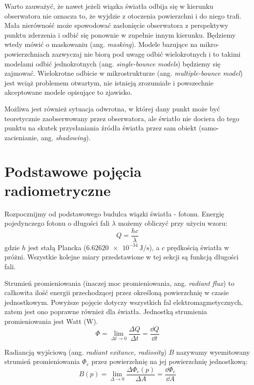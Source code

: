 \documentclass[../main.tex]{subfiles}
\begin{document}
Warto zauważyć, że nawet jeżeli wiązka światła odbija się w kierunku obserwatora nie oznacza to, że wyjdzie z otoczenia powierzchni i do niego trafi. Mała nierówność może spowodować zasłonięcie obserwatora z perspektywy punktu zderzenia i odbić się ponownie w zupełnie innym kierunku. Będziemy wtedy mówić o maskowaniu (ang. \textit{masking}). Modele bazujące na mikro-powierzchniach zazwyczaj nie biorą pod uwagę odbić wielokrotnych i to takimi modelami odbić jednokrotnych (ang. \textit{single-bounce models}) będziemy się zajmować. Wielokrotne odbicie w mikrostrukturze (ang. \textit{multiple-bounce model}) jest wciąż problemem otwartym, nie istnieją zrozumiałe i powszechnie akceptowane modele opisujące to zjawisko.

Możliwa jest również sytuacja odwrotna, w której dany punkt może być teoretycznie zaobserwowany przez obserwatora, ale światło nie dociera do tego punktu na skutek przysłaniania źródła światła przez sam obiekt (samo-zacienianie, ang. \textit{shadowing}).


\section{Podstawowe pojęcia radiometryczne}

Rozpocznijmy od podstawowego budulca wiązki światła - fotonu. Energię pojedynczego fotonu o długości fali $\lambda$ możemy obliczyć przy użyciu wzoru:
\begin{equation}
    Q = \frac{hc}{\lambda} 
\label{eq:pbr_light_energy}
\end{equation}
\noindent gdzie $h$ jest stałą Plancka ($\SI{6.62620e-34}{\joule\per\second}$), a $c$ prędkością światła w próżni. Wszystkie kolejne miary przedstawione w tej sekcji są funkcją długości fali.

Strumień promieniowania (inaczej moc promieniowania, ang. \textit{radiant flux}) to całkowita ilość energii przechodzącej przez określoną powierzchnię w czasie jednostkowym. Powyższe pojęcie dotyczy wszystkich fal elektromagmetycznych, zatem jest ono poprawne również dla światła. Jednostką strumienia promieniowania jest Watt ($\si{\watt}$).
\begin{equation}
\Phi = 
    \lim_{\Delta t \rightarrow 0}{
        \frac{\Delta Q}{\Delta t}
    } 
    = \frac{\dd Q}{\dd t}
\label{eq:pbr_radiant_flux}
\end{equation}

Radiancją wyjściową (ang. \textit{radiant exitance, radiosity}) $B$ nazywamy wyemitowany strumień promieniowania $\Phi_{e}$ przez powierzchnię na jej powierzchnię jednostkową:
\begin{equation}
B(p) = 
    \lim_{\Delta \rightarrow 0}{
        \frac{\Delta \Phi_{e}(p)}{\Delta A}
    } 
    = \frac{\dd \Phi_{e}}{\dd A}
\label{eq:pbr_radiosity}
\end{equation}  
\end{document}
